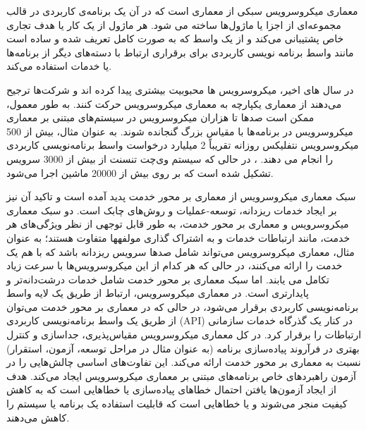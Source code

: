 


معماری میکروسرویس سبکی از معماری است که در آن یک برنامه‌ی کاربردی در قالب مجموعه‌ای از اجزا یا ماژول‌ها ساخته می شود. هر ماژول از یک کار یا هدف تجاری خاص پشتیبانی می‌کند و از یک واسط که به صورت کامل تعریف شده و ساده است مانند واسط برنامه نویسی کاربردی برای برقراری ارتباط با دسته‌های دیگر از برنامه‌ها یا خدمات استفاده می‌کند.

در سال های اخیر، میکروسرویس ها محبوبیت بیشتری پیدا کرده اند و شرکت‌ها ترجیح می‌دهند از معماری یکپارچه به معماری میکروسرویس حرکت کنند. به طور معمول، ممکن است صدها تا هزاران میکروسرویس در سیستم‌های مبتنی بر معماری میکروسرویس در برنامه‌ها با مقیاس بزرگ گنجانده شوند. به عنوان مثال، بیش از 500 میکروسرویس نتفلیکس روزانه تقریباً 2 میلیارد درخواست واسط برنامه‌نویسی کاربردی را انجام می دهند. ، در حالی که سیستم وی‌چت تنسنت از بیش از 3000 سرویس تشکیل شده است که بر روی بیش از 20000 ماشین اجرا می‌شود. 

سبک معماری میکروسرویس از معماری بر محور خدمت پدید آمده است و تاکید آن نیز بر ایجاد خدمات ریزدانه‌، توسعه-عملیات و روش‌های چابک است. 
دو سبک معماری میکروسرویس و معماری بر محور خدمت، به طور قابل توجهی از نظر ویژگی‌های هر خدمت، مانند ارتباطات خدمات و به اشتراک گذاری مولفهها متفاوت هستند؛ به عنوان مثال، معماری میکروسرویس می‌تواند شامل صدها سرویس ریزدانه باشد که با هم یک خدمت را ارائه می‌کنند، در حالی ‌که هر کدام از این میکروسرویس‌ها با سرعت زیاد تکامل می یابند. اما سبک معماری بر محور خدمت شامل خدمات درشت‌دانه‌تر و پایدارتری است. در معماری میکروسرویس، ارتباط از طریق یک لایه واسط برنامه‌نویسی کاربردی برقرار می‌شود، در حالی که در معماری بر محور خدمت می‌توان از طریق یک واسط برنامه‌نویسی کاربردی (API)  در کنار یک گذرگاه خدمات سازمانی ارتباطات را برقرار کرد. در کل معماری میکروسرویس مقیاس‌پذیری، جداسازی و کنترل بهتری در فرآروند پیاده‌سازی برنامه (به عنوان مثال در مراحل توسعه، آزمون، استقرار) نسبت به معماری بر محور خدمت ارائه می‌کند.
این تفاوت‌های اساسی چالش‌هایی را در آزمون راهبردهای خاص برنامه‌های مبتنی بر معماری میکروسرویس ایجاد می‌کند. هدف از ایجاد آزمون‌ها یافتن احتمال خطاهای پیاده‌سازی یا خطاهایی است که به کاهش کیفیت منجر می‌شوند و یا خطاهایی است که قابلیت استفاده یک برنامه یا سیستم را کاهش می‌دهند. 


